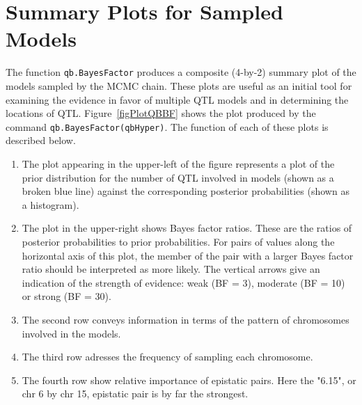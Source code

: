 \documentclass{article}
\begin{document}
\section{Summary Plots for Sampled Models}

The function \texttt{qb.BayesFactor} produces a composite (4-by-2) summary plot of the models 
sampled by the MCMC chain.  These plots are useful as an initial tool for examining the 
evidence in favor of multiple QTL models and in determining the locations of QTL. 
Figure~\ref{figPlotQBBF} shows the plot produced by the command 
\texttt{qb.BayesFactor(qbHyper)}.   The function of each of these plots is described below.
\begin{enumerate}
\item The plot appearing in the upper-left of the figure represents a
plot of the prior distribution for the number of QTL involved in
models (shown as a broken blue line) against the corresponding
posterior probabilities (shown as a histogram).
\item The plot in the upper-right shows Bayes factor ratios.  These
are the ratios of posterior probabilities to prior probabilities.  For
pairs of values along the horizontal axis of this plot, the member of
the pair with a larger Bayes factor ratio should be interpreted as
more likely. The vertical arrows give an indication of the strength of
evidence: weak (BF = 3), moderate (BF = 10) or strong (BF = 30).
\item The second row conveys information in terms of the  pattern of
chromosomes involved in the models.
\item The third row adresses the frequency of sampling each
chromosome.
\item The fourth row show relative importance of epistatic pairs. Here
the "6.15", or chr 6 by chr 15, epistatic pair is by far the strongest.
\end{enumerate}
\end{document}
